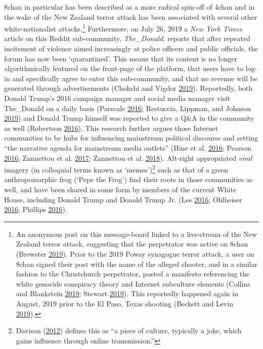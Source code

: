 \documentclass[10pt,british,A4paper,twoside]{memoir}
\begin{document}
8chan in particular has been described as a more radical spin-off of
4chan and in the wake of the New Zealand terror attack has been
associated with several other white-nationalist attacks.\footnote{An
  anonymous post on this message-board linked to a live-stream of the
  New Zealand terror attack, suggesting that the perpetrator was active
  on 8chan (Brewster \protect\hyperlink{ref-brewster_after_2019}{2019}).
  Prior to the 2019 Poway synagogue terror attack, a user on 8chan
  signed their post with the name of the alleged shooter, and in a
  similar fashion to the Christchurch perpetrator, posted a manifesto
  referencing the white genocide conspiracy theory and Internet
  subculture elements (Collins and Blankstein
  \protect\hyperlink{ref-collins_anti-semitic_2019}{2019}; Stewart
  \protect\hyperlink{ref-stewart_8chan_2019}{2019}). This reportedly
  happened again in August, 2019 prior to the El Paso, Texas shooting
  (Beckett and Levin \protect\hyperlink{ref-beckett_paso_2019}{2019}).}
Furthermore, on July 26, 2019 a \emph{New York Times} article on this
Reddit sub-community, \emph{The\_Donald}, reports that after repeated
incitement of violence aimed increasingly at police officers and public
officials, the forum has now been `quarantined'. This means that its
content is no longer algorithmically featured on the front-page of the
platform, that users have to log-in and specifically agree to enter this
sub-community, and that no revenue will be generated through
advertisements (Chokshi and Vigdor
\protect\hyperlink{ref-chokshi_reddit_2019}{2019}). Reportedly, both
Donald Trump's 2016 campaign manager and social media manager visit
The\_Donald on a daily basis (Parscale
\protect\hyperlink{ref-parscale_reddit_2016}{2016}; Restuccia, Lippman,
and Johnson \protect\hyperlink{ref-restuccia_get_2019}{2019}) and Donald
Trump himself was reported to give a Q\&A in the community as well
(Robertson \protect\hyperlink{ref-robertson_donald_2016}{2016}). This
research further argues those Internet communities to be hubs for
influencing mainstream political discourse and setting ``the narrative
agenda for mainstream media outlets'' (Hine et al.
\protect\hyperlink{ref-hine_kek_2016}{2016}; Pearson
\protect\hyperlink{ref-pearson_scientists_2016}{2016}; Zannettou et al.
\protect\hyperlink{ref-zannettou_web_2017}{2017}; Zannettou et al.
\protect\hyperlink{ref-zannettou_origins_2018}{2018}). Alt-right
appropriated \emph{viral} imagery (in colloquial terms known as
`memes')\footnote{Davison
  (\protect\hyperlink{ref-davison_language_2012}{2012}) defines this as
  ``a piece of culture, typically a joke, which gains influence through
  online transmission.''} such as that of a green anthropomorphic frog
(`Pepe the Frog') find their roots in those communities as well, and
have been shared in some form by members of the current White House,
including Donald Trump and Donald Trump Jr. (Lee
\protect\hyperlink{ref-lee_understanding_2016}{2016}; Ohlheiser
\protect\hyperlink{ref-ohlheiser_analysis_2016}{2016}; Phillips
\protect\hyperlink{ref-phillips_alt-right_2016}{2016}).
\end{document}
